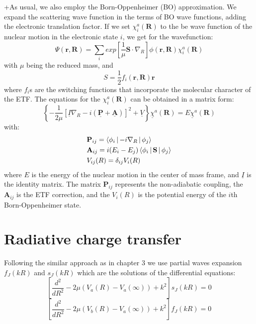 +As usual, we also employ the Born-Oppenheimer (BO) approximation. We expand the scattering wave function in the terms of BO wave functions, adding the electronic translation factor. 
If we set $ \chi_i^a(\mathbf{R}) $ to the be wave function of the nuclear motion in the electronic state $ i $, we get for the wavefunction:
\begin{equation}
\Psi(\mathbf{r},\mathbf{R}) = \sum_i{exp\left[\frac{1}{\mu}\mathbf{S}\cdot\nabla_R \right]\phi(\mathbf{r},\mathbf{R}) }\chi_i^a(\mathbf{R})
\end{equation}
with $ \mu $ being the reduced mass, and 
\begin{equation}
S = \frac{1}{2}f_i(\mathbf{r},\mathbf{R})\mathbf{r}
\end{equation}
where $ f_i $s are the switching functions that incorporate the molecular character of the ETF.
The equations for the $ \chi_i^a(\mathbf{R}) $ can be obtained in a matrix form:
\begin{equation}
\left\{-\frac{1}{2\mu}\left[\underline{I}\nabla_R - i(\underline{\mathbf{P}} + \underline{\mathbf{A}})\right]^2 + \underline{V}\right\}\underline{\chi}^a(\mathbf{R}) = E\underline{\chi}^a(\mathbf{R})
\end{equation}
with:
\begin{equation}\label{matrixFactors1}
\begin{split}
& \mathbf{P}_{ij} = \Braket{\phi_i | -i\nabla_R | \phi_j} \\*
& \mathbf{A}_{ij} = i(E_i - E_j)\Braket{\phi_i | \mathbf{S} | \phi_j} \\*
& V_{ij}(R) = \delta_{ij}V_i(R)
\end{split}
\end{equation}
where $ E $ is the energy of the nuclear motion in the center of mass frame, and $ \underline{I} $ is the identity matrix. The matrix $ \mathbf{P}_{ij} $ represents the non-adiabatic coupling, the $ \mathbf{A}_{ij} $ is the ETF correction, and the $ V_i(R) $ is the potential energy of the $ i $th Born-Oppenheimer state.

\section{ Radiative charge transfer}

Following the similar approach as in chapter 3 we use partial waves expansion $ f_J(kR) $ and $ s_J(kR) $ which are the solutions of the differential equations:
\begin{equation}
\left[\frac{d^2}{dR^2} - 2\mu\left(V_a(R) - V_a(\infty)\right)+k^2\right]s_J(kR) = 0
\end{equation}
\begin{equation}
\left[\frac{d^2}{dR^2} - 2\mu\left(V_b(R) - V_a(\infty)\right)+k^2\right]f_J(kR) = 0
\end{equation}

